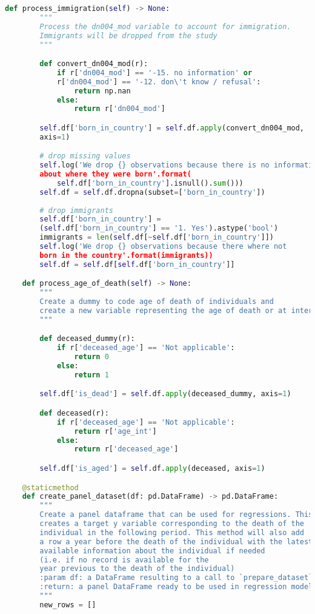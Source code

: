 \begin{lstlisting}[language=Python]
    def process_immigration(self) -> None:
        """
        Process the dn004_mod variable to account for immigration.
        Immigrants will be dropped from the study
        """

        def convert_dn004_mod(r):
            if r['dn004_mod'] == '-15. no information' or
            r['dn004_mod'] == '-12. don\'t know / refusal':
                return np.nan
            else:
                return r['dn004_mod']

        self.df['born_in_country'] = self.df.apply(convert_dn004_mod,
        axis=1)

        # drop missing values
        self.log('We drop {} observations because there is no information
        about where they were born'.format(
            self.df['born_in_country'].isnull().sum()))
        self.df = self.df.dropna(subset=['born_in_country'])
        
        # drop immigrants
        self.df['born_in_country'] = 
        (self.df['born_in_country'] == '1. Yes').astype('bool')
        immigrants = len(self.df[~self.df['born_in_country']])
        self.log('We drop {} observations because there where not
        born in the country'.format(immigrants))
        self.df = self.df[self.df['born_in_country']]

    def process_age_of_death(self) -> None:
        """
        Create a dummy to code age of death of individuals and
        create a new variable representing the age of death or at interview
        """

        def deceased_dummy(r):
            if r['deceased_age'] == 'Not applicable':
                return 0
            else:
                return 1

        self.df['is_dead'] = self.df.apply(deceased_dummy, axis=1)

        def deceased(r):
            if r['deceased_age'] == 'Not applicable':
                return r['age_int']
            else:
                return r['deceased_age']

        self.df['is_aged'] = self.df.apply(deceased, axis=1)

    @staticmethod
    def create_panel_dataset(df: pd.DataFrame) -> pd.DataFrame:
        """
        Create a panel dataframe that can be used for regressions. This
        creates a target y variable corresponding to the death of the
        individual in the following period. This method will also add
        a row a year before the death of the individual with the latest
        available information about the individual if needed
        (i.e. if no record is available for the
        year previous to the death of the individual)
        :param df: a DataFrame resulting to a call to `prepare_dataset`
        :return: a panel DataFrame ready to be used in regression models.
        """
        new_rows = []


\end{lstlisting}
